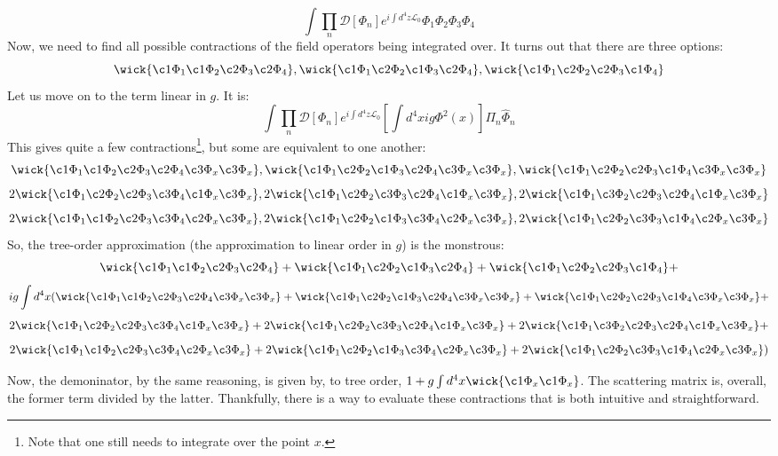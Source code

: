 \documentclass{report}
\begin{document}
\[
\int \prod_n \mathcal{D}[\Phi_n]
e^{i\int d^4z \mathcal{L}_0}
\Phi_1 \Phi_2 \Phi_3 \Phi_4
\]
Now, we need to find all possible contractions of the field operators being integrated over. It turns out that there are three options:
\[
\wick{\c1 \Phi_1 \c1 \Phi_2 \c2 \Phi_3 \c2 \Phi_4}, \wick{\c1 \Phi_1 \c2 \Phi_2 \c1 \Phi_3 \c2 \Phi_4}, \wick{\c1 \Phi_1 \c2 \Phi_2 \c2 \Phi_3 \c1 \Phi_4}
\]
Let us move on to the term linear in $g$. It is:
\[
\int \prod_n \mathcal{D}[\Phi_n]
e^{i\int d^4z \mathcal{L}_0}
[\int d^4x ig \Phi^2(x)]
\Pi_n \hat{\Phi}_n
\]
This gives quite a few contractions\footnote{Note that one still needs to integrate over the point $x$.}, but some are equivalent to one another:
\[
\wick{\c1 \Phi_1 \c1 \Phi_2 \c2 \Phi_3 \c2 \Phi_4 \c3 \Phi_x \c3 \Phi_x}, 
\wick{\c1 \Phi_1 \c2 \Phi_2 \c1 \Phi_3 \c2 \Phi_4 \c3 \Phi_x \c3 \Phi_x}, 
\wick{\c1 \Phi_1 \c2 \Phi_2 \c2 \Phi_3 \c1 \Phi_4 \c3 \Phi_x \c3 \Phi_x}
\]
\[
2 \wick{\c1 \Phi_1 \c2 \Phi_2 \c2 \Phi_3 \c3 \Phi_4 \c1 \Phi_x \c3 \Phi_x}, 
2 \wick{\c1 \Phi_1 \c2 \Phi_2 \c3 \Phi_3 \c2 \Phi_4 \c1 \Phi_x \c3 \Phi_x}, 
2 \wick{\c1 \Phi_1 \c3 \Phi_2 \c2 \Phi_3 \c2 \Phi_4 \c1 \Phi_x \c3 \Phi_x}
\]
\[
2 \wick{\c1 \Phi_1 \c1 \Phi_2 \c2 \Phi_3 \c3 \Phi_4 \c2 \Phi_x \c3 \Phi_x}, 
2 \wick{\c1 \Phi_1 \c2 \Phi_2 \c1 \Phi_3 \c3 \Phi_4 \c2 \Phi_x \c3 \Phi_x}, 
2 \wick{\c1 \Phi_1 \c2 \Phi_2 \c3 \Phi_3 \c1 \Phi_4 \c2 \Phi_x \c3 \Phi_x}
\]
So, the tree-order approximation (the approximation to linear order in $g$) is the monstrous:
\[
\wick{\c1 \Phi_1 \c1 \Phi_2 \c2 \Phi_3 \c2 \Phi_4} + 
\wick{\c1 \Phi_1 \c2 \Phi_2 \c1 \Phi_3 \c2 \Phi_4} + 
\wick{\c1 \Phi_1 \c2 \Phi_2 \c2 \Phi_3 \c1 \Phi_4} + \]\[
ig\int d^4x (\wick{\c1 \Phi_1 \c1 \Phi_2 \c2 \Phi_3 \c2 \Phi_4 \c3 \Phi_x \c3 \Phi_x} + 
\wick{\c1 \Phi_1 \c2 \Phi_2 \c1 \Phi_3 \c2 \Phi_4 \c3 \Phi_x \c3 \Phi_x} + 
\wick{\c1 \Phi_1 \c2 \Phi_2 \c2 \Phi_3 \c1 \Phi_4 \c3 \Phi_x \c3 \Phi_x} + \]\[
2 \wick{\c1 \Phi_1 \c2 \Phi_2 \c2 \Phi_3 \c3 \Phi_4 \c1 \Phi_x \c3 \Phi_x} + 
2 \wick{\c1 \Phi_1 \c2 \Phi_2 \c3 \Phi_3 \c2 \Phi_4 \c1 \Phi_x \c3 \Phi_x} + 
2 \wick{\c1 \Phi_1 \c3 \Phi_2 \c2 \Phi_3 \c2 \Phi_4 \c1 \Phi_x \c3 \Phi_x} + \]\[
2 \wick{\c1 \Phi_1 \c1 \Phi_2 \c2 \Phi_3 \c3 \Phi_4 \c2 \Phi_x \c3 \Phi_x} + 
2 \wick{\c1 \Phi_1 \c2 \Phi_2 \c1 \Phi_3 \c3 \Phi_4 \c2 \Phi_x \c3 \Phi_x} + 
2 \wick{\c1 \Phi_1 \c2 \Phi_2 \c3 \Phi_3 \c1 \Phi_4 \c2 \Phi_x \c3 \Phi_x})
\]

Now, the demoninator, by the same reasoning, is given by, to tree order, $1 + g\int d^4x \wick{\c1 \Phi_x \c1 \Phi_x}$. The scattering matrix is, overall, the former term divided by the latter. Thankfully, there is a way to evaluate these contractions that is both intuitive and straightforward.
\end{document}
